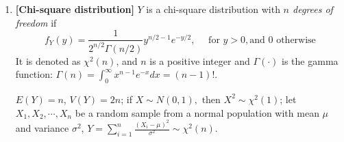 \documentclass[a4paper]{article}
\begin{document}
\begin{enumerate}
\item
\textbf{[Chi-square distribution]}
$Y$ is a chi-square distribution with \textit{$n$ degrees of freedom} if 
\begin{equation}
f_{Y}(y)=\frac{1}{2^{n / 2} \Gamma(n / 2)} y^{n / 2-1} e^{-y / 2}, \quad \text { for } y>0, \text{and 0 otherwise}
\end{equation}
It is denoted as $\chi^{2}(n)$, and $n$ is a positive integer and $\Gamma(\cdot)$ is the gamma function: $\Gamma(n)=\int_{0}^{\infty} x^{n-1} e^{-x} d x=(n-1) !$.

$E(Y)=n$, $V(Y)=2 n$; if $X \sim N(0,1), \text { then } X^{2} \sim \chi^{2}(1)$; let $X_{1}, X_{2}, \cdots, X_{n}$ be a random sample from a normal population with mean $\mu$ and variance $\sigma^2$, $Y=\sum_{i=1}^{n} \frac{\left(X_{i}-\mu\right)^{2}}{\sigma^{2}} \sim \chi^{2}(n)$.










\end{enumerate}
\end{document}
